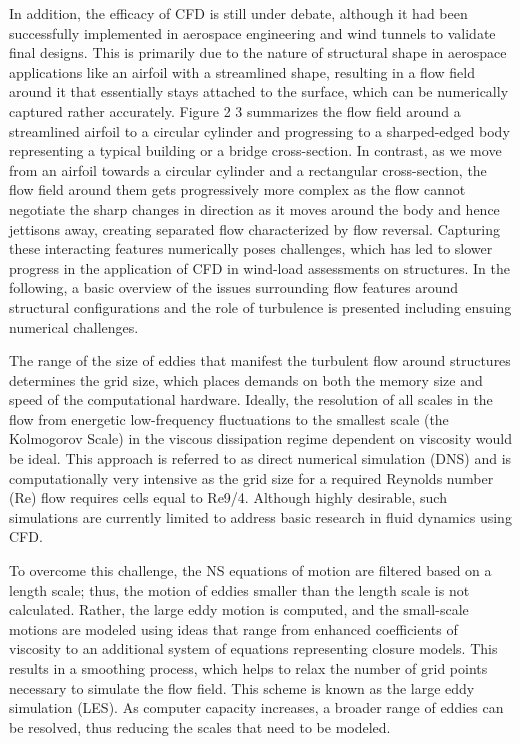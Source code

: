 In addition, the efficacy of CFD is still under debate, although it had been successfully implemented in aerospace engineering and wind tunnels to validate final designs. This is primarily due to the nature of structural shape in aerospace applications like an airfoil with a streamlined shape, resulting in a flow field around it that essentially stays attached to the surface, which can be numerically captured rather accurately.
Figure 2 3 summarizes the flow field around a streamlined airfoil to a circular cylinder and progressing to a sharped-edged body representing a typical building or a bridge cross-section. In contrast, as we move from an airfoil towards a circular cylinder and a rectangular cross-section, the flow field around them gets progressively more complex as the flow cannot negotiate the sharp changes in direction as it moves around the body and hence jettisons away, creating separated flow characterized by flow reversal. Capturing these interacting features numerically poses challenges, which has led to slower progress in the application of CFD in wind-load assessments on structures. In the following, a basic overview of the issues surrounding flow features around structural configurations and the role of turbulence is presented including ensuing numerical challenges. 

The range of the size of eddies that manifest the turbulent flow around structures determines the grid size, which places demands on both the memory size and speed of the computational hardware. Ideally, the resolution of all scales in the flow from energetic low-frequency fluctuations to the smallest scale (the Kolmogorov Scale) in the viscous dissipation regime dependent on viscosity would be ideal. This approach is referred to as direct numerical simulation (DNS) and is computationally very intensive as the grid size for a required Reynolds number (Re) flow requires cells equal to Re9/4. Although highly desirable, such simulations are currently limited to address basic research in fluid dynamics using CFD. 

To overcome this challenge, the NS equations of motion are filtered based on a length scale; thus, the motion of eddies smaller than the length scale is not calculated. Rather, the large eddy motion is computed, and the small-scale motions are modeled using ideas that range from enhanced coefficients of viscosity to an additional system of equations representing closure models. This results in a smoothing process, which helps to relax the number of grid points necessary to simulate the flow field. This scheme is known as the large eddy simulation (LES). As computer capacity increases, a broader range of eddies can be resolved, thus reducing the scales that need to be modeled. 

